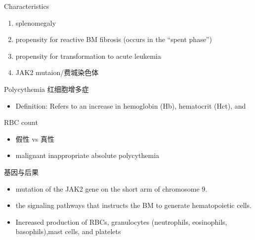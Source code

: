 \documentclass[
  ignorenonframetext,
]{beamer}
\providecommand{\tightlist}{%
  \setlength{\itemsep}{0pt}\setlength{\parskip}{0pt}}
\begin{document}
\begin{frame}
\begin{block}{Characteristics}
\protect\hypertarget{characteristics}{}
\begin{enumerate}
\item
  splenomegaly
\item
  propensity for reactive BM fibrosis (occurs in the ``spent phase'')
\item
  propensity for transformation to acute leukemia
\item
  JAK2 mutaion/费城染色体
\end{enumerate}
\end{block}
\end{frame}

\begin{frame}
\begin{block}{Polycythemia 红细胞增多症}
\protect\hypertarget{polycythemia-ux7ea2ux7ec6ux80deux589eux591aux75c7}{}
\begin{itemize}
\tightlist
\item
  Definition: Refers to an increase in hemoglobin (Hb), hematocrit
  (Hct), and
\end{itemize}

RBC count

\begin{itemize}
\item
  假性 vs 真性
\item
  malignant inappropriate absolute polycythemia
\end{itemize}
\end{block}
\end{frame}

\begin{frame}
\begin{block}{基因与后果}
\protect\hypertarget{ux57faux56e0ux4e0eux540eux679c}{}
\begin{itemize}
\item
  mutation of the JAK2 gene on the short arm of chromosome 9.
\item
  the signaling pathways that instructs the BM to generate hematopoietic
  cells.
\item
  Increased production of RBCs, granulocytes (neutrophils, eosinophils,
  basophils),mast cells, and platelets
\end{itemize}
\end{block}
\end{frame}
\end{document}
